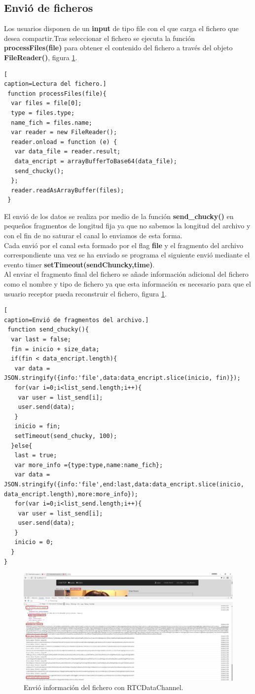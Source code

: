 \subsection*{Envió de ficheros}
Los usuarios disponen de un \textbf{input} de tipo file con el que carga el fichero que desea compartir.Tras seleccionar el fichero se ejecuta la función \textbf{processFiles(file)} para obtener el contenido del fichero a través del objeto \textbf{FileReader()}, figura \ref{fig:fildSendUser}. 
\begin{lstlisting}[
caption=Lectura del fichero.]
 function processFiles(file){
  var files = file[0];
  type = files.type;
  name_fich = files.name;
  var reader = new FileReader();
  reader.onload = function (e) {
   var data_file = reader.result;
   data_encript = arrayBufferToBase64(data_file);
   send_chucky();
  };
  reader.readAsArrayBuffer(files);
 }
\end{lstlisting}
El envió de los datos se realiza por medio de la función \textbf{send\_chucky()} en pequeños fragmentos de longitud fija ya que no sabemos la longitud del archivo y con el fin de no saturar el canal lo enviamos de esta forma.
\\Cada envió por el canal esta formado por el flag \textbf{file} y el fragmento del archivo correspondiente una vez se ha enviado se programa el siguiente envió mediante el evento timer \textbf{setTimeout(sendChuncky,time)}.
\\Al enviar el fragmento final del fichero se añade información adicional del fichero como el nombre y tipo de fichero ya que esta información es necesario para que el usuario receptor pueda reconstruir el fichero, figura \ref{fig:fildSendUser}.
\begin{lstlisting}[
caption=Envió de fragmentos del archivo.]
 function send_chucky(){
  var last = false;
  fin = inicio + size_data;
  if(fin < data_encript.length){
   var data = JSON.stringify({info:'file',data:data_encript.slice(inicio, fin)});
   for(var i=0;i<list_send.length;i++){
    var user = list_send[i];
    user.send(data);
   }
   inicio = fin;
   setTimeout(send_chucky, 100);
  }else{
   last = true;
   var more_info ={type:type,name:name_fich};
   var data = JSON.stringify({info:'file',end:last,data:data_encript.slice(inicio, data_encript.length),more:more_info});
   for(var i=0;i<list_send.length;i++){
    var user = list_send[i];
    user.send(data);
   }
   inicio = 0;
  }
}
\end{lstlisting}
\begin{figure}[!h]
\centering
\includegraphics[width=0.8\linewidth]{Figures/filSendUser}
\decoRule
\caption[Envió información del fichero con  RTCDataChannel.]{Envió información del fichero con  RTCDataChannel.}
\label{fig:fildSendUser}
\end{figure}
